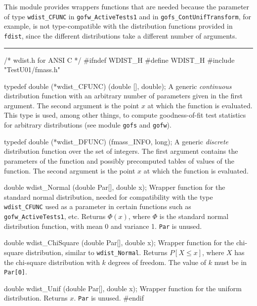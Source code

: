 
This module provides wrappers functions that are needed
because the parameter of type {\tt wdist\_CFUNC} in {\tt gofw\_ActiveTests1}
and in {\tt gofs\_ContUnifTransform}, for example, is not type-compatible
with the distribution functions provided in {\tt fdist}, since the different
distributions take a different number of arguments.


\bigskip\hrule
\code\hide
/* wdist.h for ANSI C */
#ifndef WDIST_H
#define WDIST_H
\endhide
#include "TestU01/fmass.h"
\endcode



\code

typedef double (*wdist_CFUNC) (double [], double);
\endcode
  \tab A generic {\em continuous\/} distribution function with an
  arbitrary number of parameters given in the first argument.
  The second argument is the point $x$ at which the function is evaluated.
 \ifdetailed  %
  This type is used, among other things, to compute goodness-of-fit
  test statistics for arbitrary distributions (see module {\tt gofs} and
  {\tt gofw}).
 \fi %
 \endtab
\code


typedef double (*wdist_DFUNC) (fmass_INFO, long);
\endcode
  \tab A generic {\em discrete\/} distribution function over the set of
  integers.
  The first argument contains the parameters of the function and
  possibly precomputed tables of values of the function.
  The second argument is the point $x$ at which the function is evaluated.
 \endtab




\code

double wdist_Normal (double Par[], double x);
\endcode
\tab
  Wrapper function for the {standard normal} distribution, needed
  for compatibility with the type {\tt wdist\_CFUNC} used as a parameter
  in certain functions such as {\tt gofw\_ActiveTests1}, etc.
  Returns $\Phi(x)$, where $\Phi$ is the standard normal distribution
  function, with mean 0 and variance 1.
  {\tt Par} is unused.
\endtab
\code


double wdist_ChiSquare (double Par[], double x);
\endcode
\tab
   Wrapper function for the {chi-square} distribution, similar to
   {\tt wdist\_Normal}.
   Returns $P[X \le x]$, where $X$ has the chi-square distribution
   with $k$ degrees of freedom.  The value of $k$ must be in {\tt Par[0]}.
\endtab
\code


double wdist_Unif (double Par[], double x);
\endcode
\tab
  Wrapper function for the {uniform} distribution.
  Returns $x$. {\tt Par} is unused.
\endtab
\code
\hide
#endif
\endhide
\endcode
